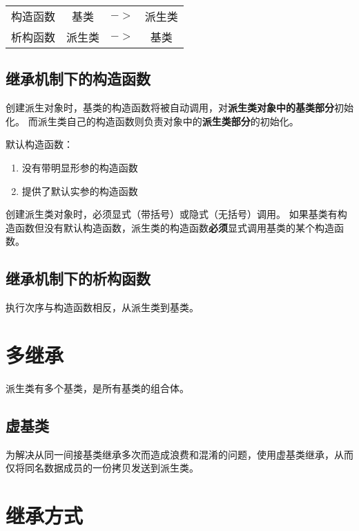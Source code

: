 \begin{table}[!htbp]
    \centering
    \begin{tabular}{lccc}
        \hline
        构造函数 & 基类   & $->$ & 派生类 \\
        析构函数 & 派生类 & $->$ & 基类   \\
        \hline
    \end{tabular}
\end{table}

\subsection{继承机制下的构造函数}

创建派生对象时，基类的构造函数将被自动调用，对\textbf{派生类对象中的基类部分}初始化。
而派生类自己的构造函数则负责对象中的\textbf{派生类部分}的初始化。

默认构造函数：
\begin{enumerate}
    \item 没有带明显形参的构造函数
    \item 提供了默认实参的构造函数
\end{enumerate}

创建派生类对象时，必须显式（带括号）或隐式（无括号）调用。
如果基类有构造函数但没有默认构造函数，派生类的构造函数\textbf{必须}显式调用基类的某个构造函数。

\subsection{继承机制下的析构函数}

执行次序与构造函数相反，从派生类到基类。

\section{多继承}

派生类有多个基类，是所有基类的组合体。

\subsection{虚基类}

为解决从同一间接基类继承多次而造成浪费和混淆的问题，使用虚基类继承，从而仅将同名数据成员的一份拷贝发送到派生类。

\section{继承方式}

